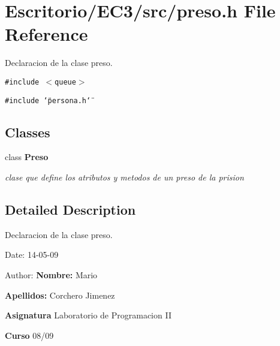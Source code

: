 \section{Escritorio/EC3/src/preso.h File Reference}
\label{preso_8h}
Declaracion de la clase preso. 

{\tt \#include $<$queue$>$}\par
{\tt \#include \char`\"{}persona.h\char`\"{}}\par
\subsection*{Classes}
\begin{CompactItemize}
\item 
class {\bf Preso}
\begin{CompactList}\small\item\em clase que define los atributos y metodos de un preso de la prision \item\end{CompactList}\end{CompactItemize}


\subsection{Detailed Description}
Declaracion de la clase preso. 

\begin{Desc}
\item[Date:]14-05-09 \end{Desc}
\begin{Desc}
\item[Author:]{\bf Nombre:} Mario \par
 {\bf Apellidos:} Corchero Jimenez \par
 {\bf Asignatura} Laboratorio de Programacion II \par
 {\bf Curso} 08/09 \end{Desc}
